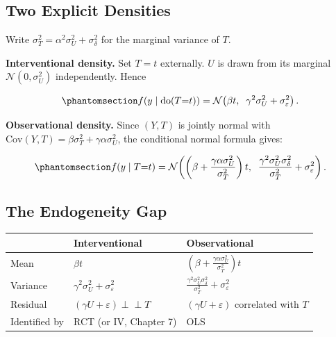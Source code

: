 \documentclass[
  a4paper,
]{book}
\newcounter{none} %
\newcommand{\doop}{\operatorname{do}}
\newcommand{\indep}{\perp\!\!\!\perp}
\begin{document}
\subsection{Two Explicit Densities}\label{two-explicit-densities}

Write \(\sigma_T^2 = \alpha^2\sigma_U^2 + \sigma_\delta^2\) for the
marginal variance of \(T\).

\textbf{Interventional density.} Set \(T = t\) externally. \(U\) is
drawn from its marginal \(\mathcal{N}(0,\sigma_U^2)\) independently.
Hence

\begin{equation}\protect\phantomsection\label{eq-int}{f\!\left(y \mid \doop(T{=}t)\right) = \mathcal{N}\!\left(\beta t,\;\; \gamma^2\sigma_U^2 + \sigma_\varepsilon^2\right).}\end{equation}

\textbf{Observational density.} Since \((Y, T)\) is jointly normal with
\(\mathrm{Cov}(Y, T) = \beta\sigma_T^2 + \gamma\alpha\sigma_U^2\), the
conditional normal formula gives:

\begin{equation}\protect\phantomsection\label{eq-obs}{f\!\left(y \mid T{=}t\right) = \mathcal{N}\!\left(\left(\beta + \frac{\gamma\alpha\sigma_U^2}{\sigma_T^2}\right)t,\;\; \frac{\gamma^2\sigma_U^2\sigma_\delta^2}{\sigma_T^2} + \sigma_\varepsilon^2\right).}\end{equation}

\subsection{The Endogeneity Gap}\label{the-endogeneity-gap}

{\def\LTcaptype{none} %
\begin{longtable}[]{@{}
  >{\raggedright\arraybackslash}p{}
  >{\raggedright\arraybackslash}p{}
  >{\raggedright\arraybackslash}p{}@{}}
\toprule\noalign{}
\begin{minipage}[b]{\linewidth}\raggedright
\end{minipage} & \begin{minipage}[b]{\linewidth}\raggedright
\textbf{Interventional}
\end{minipage} & \begin{minipage}[b]{\linewidth}\raggedright
\textbf{Observational}
\end{minipage} \\
\midrule\noalign{}
\endhead
\bottomrule\noalign{}
\endlastfoot
Mean & \(\beta t\) &
\(\left(\beta + \frac{\gamma\alpha\sigma_U^2}{\sigma_T^2}\right)t\) \\
Variance & \(\gamma^2\sigma_U^2 + \sigma_\varepsilon^2\) &
\(\frac{\gamma^2\sigma_U^2\sigma_\delta^2}{\sigma_T^2} + \sigma_\varepsilon^2\) \\
Residual & \((\gamma U{+}\varepsilon) \indep T\) &
\((\gamma U{+}\varepsilon)\) correlated with \(T\) \\
Identified by & RCT (or IV, Chapter 7) & OLS \\
\end{longtable}
}
\end{document}
